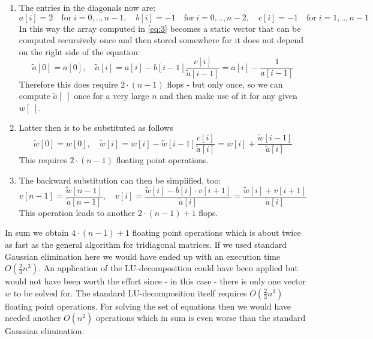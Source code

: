 \documentclass[11pt,a4wide]{article}
\begin{document}
\begin{enumerate}
	\item The entries in the diagonals now are:
	\begin{equation}
	a[i]=2\quad \text{for}\; i=0,..,n-1,\quad	b[i]=-1\quad \text{for}\; i=0,..,n-2,\quad	c[i]=-1\quad \text{for}\; i=1,..,n-1
	\label{eq:6}
	\end{equation}
	In this way the array computed in \ref{eq:3} becomes a static vector that can be computed recursively once and then stored somewhere for it does not depend on the right side of the equation:
	\begin{equation}
	\tilde{a}[0]=a[0],\quad \tilde{a}[i]=a[i]-b[i-1]\dfrac{c[i]}{\tilde{a}[i-1]}=a[i]-\dfrac{1}{a[i-1]}
	\label{eq:7}
	\end{equation}
	Therefore this does require $2\cdot (n-1)$ flops -  but only once, so we can compute $\tilde{a}[\;]$ once for a very large $n$ and then make use of it for any given $w[\;]$.
	\item Latter then is to be substituted as follows
	\begin{equation}
	\tilde{w}[0]=w[0],\quad \tilde{w}[i]=w[i]-\tilde{w}[i-1]\dfrac{c[i]}{\tilde{a}[i]}=	w[i]+\dfrac{\tilde{w}[i-1]}{\tilde{a}[i]}
	\label{eq:4}
		\end{equation}
	This requires $2\cdot(n-1)$ floating point operations.
	\item The backward substitution can then be simplified, too:
		\begin{equation}
	v[n-1]=\dfrac{\tilde{w}[n-1]}{\tilde{a}[n-1]},\quad v[i]=\dfrac{\tilde{w}[i]-b[i]\cdot v[i+1]}{\tilde{a}[i]}=\dfrac{\tilde{w}[i]+v[i+1]}{\tilde{a}[i]}
	\label{eq:5}
	\end{equation}
	This operation leads to another $2\cdot(n-1)+1$ flops.
\end{enumerate}
In sum we obtain $4\cdot(n-1)+1$ floating point operations which is about twice as fast as the general algorithm for tridiagonal matrices. If we used standard Gaussian elimination here we would have ended up with an execution time $O(\frac{2}{3}n^3)$. An application of the LU-decomposition could have been applied but would not have been worth the effort since - in this case - there is only one vector $w$ to be solved for. The standard LU-decomposition itself requires $O(\frac{2}{3}n^3)$ floating point operations. For solving the set of equations then we would have needed another $O(n^2)$ operations which in sum is even worse than the standard Gaussian elimination.
\end{document}
